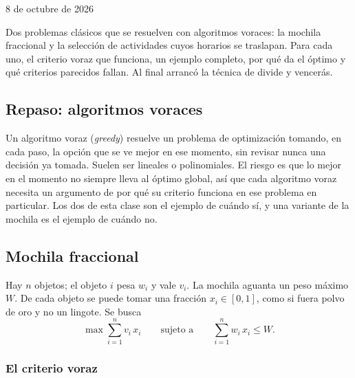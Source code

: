 \documentclass[11pt,letterpaper]{article}
\begin{document}

%
      {8 de octubre de 2026}

\begin{quick_sum}
  Dos problemas clásicos que se resuelven con algoritmos voraces: la
  mochila fraccional y la selección de actividades cuyos horarios se
  traslapan. Para cada uno, el criterio voraz que funciona, un
  ejemplo completo, por qué da el óptimo y qué criterios parecidos
  fallan. Al final arrancó la técnica de divide y vencerás.
\end{quick_sum}

\subsection*{Repaso: algoritmos voraces}

Un algoritmo voraz (\textit{greedy}) resuelve un problema de
optimización tomando, en cada paso, la opción que se ve mejor en ese
momento, sin revisar nunca una decisión ya tomada. Suelen ser lineales
o polinomiales. El riesgo es que lo mejor en el momento no siempre
lleva al óptimo global, así que cada algoritmo voraz necesita un
argumento de por qué su criterio funciona en ese problema en
particular. Los dos de esta clase son el ejemplo de cuándo sí, y una
variante de la mochila es el ejemplo de cuándo no.


\subsection*{Mochila fraccional}

\begin{definicion}
  Hay $n$ objetos; el objeto $i$ pesa $w_i$ y vale $v_i$. La mochila
  aguanta un peso máximo $W$. De cada objeto se puede tomar una
  fracción $x_i \in [0, 1]$, como si fuera polvo de oro y no un
  lingote. Se busca
  \[
    \max \sum_{i=1}^{n} v_i\, x_i
    \qquad \text{sujeto a} \qquad
    \sum_{i=1}^{n} w_i\, x_i \leq W .
  \]
\end{definicion}

\subsubsection*{El criterio voraz}
\end{document}
